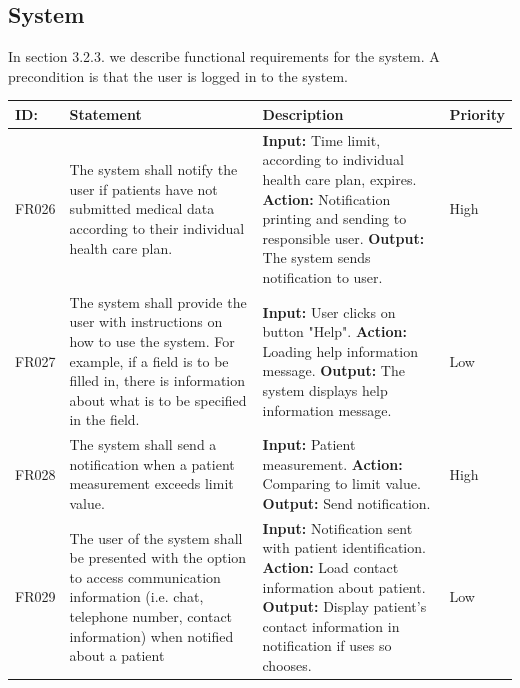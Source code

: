 \documentclass{scrreprt}
\begin{document}
\subsection{System}
In section 3.2.3. we describe functional requirements for the system. A precondition is that the user is logged in to the system.
\begin{center}
\begin{tabularx}{\linewidth}{| l | X | X | l |}
\hline
\textbf{ID:} & \textbf{Statement} & \textbf{Description} & \textbf{Priority} \\ 
\hline
FR026 & The system shall notify the user if patients have not submitted medical data according to their individual health care plan. & \textbf{Input:} Time limit, according to individual health care plan, expires.
\newline \textbf{Action:} Notification printing and sending to responsible user.
\newline \textbf{Output:} The system sends notification to user. & High \\ 
\hline
FR027 & The system shall provide the user with instructions on how to use the system. For example, if a field is to be filled in, there is information about what is to be specified in the field. & \textbf{Input:} User clicks on button "Help".
\newline \textbf{Action:} Loading help information message.
\newline \textbf{Output:} The system displays help information message. & Low \\ 
\hline
FR028 & The system shall send a notification when a patient measurement exceeds limit value. & \textbf{Input:} Patient measurement.
\newline \textbf{Action:} Comparing to limit value.
\newline \textbf{Output:} Send notification. & High \\
\hline
FR029 & The user of the system shall be presented with the option to access communication information (i.e. chat, telephone number, contact information) when notified about a patient & \textbf{Input:} Notification sent with patient identification.
\newline \textbf{Action:} Load contact information about patient.
\newline \textbf{Output:} Display patient's contact information in notification if uses so chooses. & Low \\
\hline
\end{tabularx}
\end{center}
\end{document}
